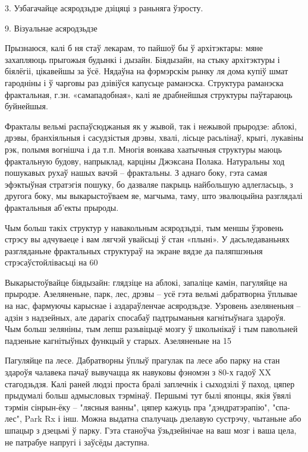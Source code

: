 3. Узбагачайце асяродзьдзе дзіцяці з раньняга ўзросту.


9. Візуальнае асяродзьдзе

Прызнаюся, калі б ня стаў лекарам, то пайшоў бы ў архітэктары: мяне захапляюць прыгожыя будынкі і дызайн. Біядызайн, на стыку архітэктуры і біялёгіі, цікавейшы за ўсё. Нядаўна на фэрмэрскім рынку ля дома купіў шмат гародніны і ў чарговы раз дзівіўся капусьце раманэска. Структура раманэска фрактальная, г.зн. «самападобная», калі яе драбнейшыя структуры паўтараюць буйнейшыя.

Фракталы вельмі распаўсюджаныя як у жывой, так і нежывой прыродзе: аблокі, дрэвы, бранхіяльныя і сасудзістыя дрэвы, хвалі, лісьце расьлінаў, крыгі, лукавіны рэк, полымя вогнішча і да т.п. Многія вонкава хаатычныя структуры маюць фрактальную будову, напрыклад, карціны Джэксана Полака. Натуральны ход пошукавых рухаў нашых вачэй – фрактальны. З аднаго боку, гэта самая эфэктыўная стратэгія пошуку, бо дазваляе пакрыць найбольшую адлегласьць, з другога боку, мы выкарыстоўваем яе, магчыма, таму, што эвалюцыйна разглядалі фрактальныя аб'екты прыроды. 

Чым больш такіх структур у навакольным асяродзьдзі, тым меншы ўзровень стрэсу вы адчуваеце і вам лягчэй увайсьці ў стан «плыні». У дасьледаваньнях разгляданьне фрактальных структураў на экране вядзе да паляпшэньня стрэсаўстойлівасьці на 60%

Выкарыстоўвайце біядызайн: глядзіце на аблокі, запаліце камін, пагуляйце на прыродзе. Азеляненьне, парк, лес, дрэвы – усё гэта вельмі дабратворна ўплывае на нас, фармуючы карыснае і аздараўленчае асяродзьдзе. Узровень азеляненьня – адзін з надзейных, але дарагіх спосабаў падтрыманьня кагнітыўнага здароўя. Чым больш зеляніны, тым лепш разьвіцьцё мозгу ў школьнікаў і тым павольней падзеньне кагнітыўных функцый у старых. Азеляненьне на 15%

Пагуляйце па лесе. Дабратворны ўплыў прагулак па лесе або парку на стан здароўя чалавека пачаў вывучацца як навуковы фэномэн з 80-х гадоў XX стагодзьдзя. Калі раней людзі проста бралі заплечнік і сыходзілі ў паход, цяпер прыдумалі больш адмысловых тэрмінаў. Першымі тут былі японцы, якія ўвялі тэрмін сінрын-ёку – "лясныя ванны", цяпер кажуць пра "дэндратэрапію", "спа-лес", Park Rx і інш. Можна выдатна спалучаць дзелавую сустрэчу, чытаньне або шпацыр з дзецьмі ў парку. Гэта станоўча ўзьдзейнічае на ваш мозг і ваша цела, не патрабуе напругі і заўсёды даступна.


